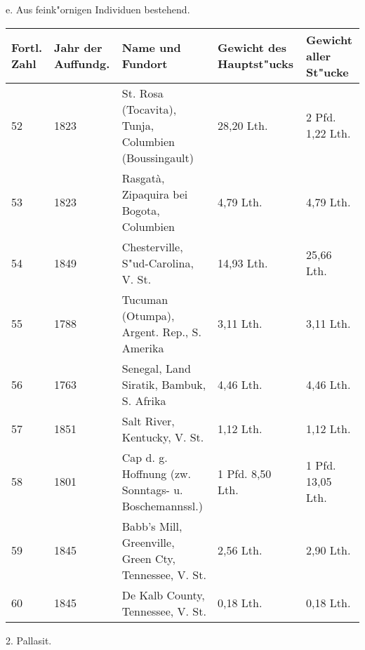 \documentclass[a4paper, 11pt, oneside]{article}
\begin{document}
\clearpage
\begin{center}
e. Aus feink"ornigen Individuen bestehend.
\end{center}
\begin{center}
\begin{footnotesize}
\begin{tabular}{ |p{7mm}|p{9mm}|p{45mm}|p{24mm}|p{24mm}| }
    \hline
    Fortl. Zahl & Jahr der Auffundg. & Name und Fundort & Gewicht des Hauptst"ucks & Gewicht aller St"ucke\\
    \hline\hline
    52 & 1823 & St. Rosa (Tocavita), Tunja, Columbien (Boussingault) & 28,20 Lth. & 2 Pfd. 1,22 Lth.\\\hline
    53 & 1823 & Rasgatà, Zipaquira bei Bogota, Columbien & 4,79 Lth. & 4,79 Lth.\\\hline
    54 & 1849 & Chesterville, S"ud-Carolina, V. St. & 14,93 Lth. & 25,66 Lth.\\\hline
    55 & 1788 & Tucuman (Otumpa), Argent. Rep., S. Amerika & 3,11 Lth. & 3,11 Lth.\\\hline
    56 & 1763 & Senegal, Land Siratik, Bambuk, S. Afrika & 4,46 Lth. & 4,46 Lth.\\\hline
    57 & 1851 & Salt River, Kentucky, V. St. & 1,12 Lth. & 1,12 Lth.\\\hline
    58 & 1801 & Cap d. g. Hoffnung (zw. Sonntags- u. Boschemannssl.) & 1 Pfd. 8,50 Lth. & 1 Pfd. 13,05 Lth.\\\hline
    59 & 1845 & Babb's Mill, Greenville, Green Cty, Tennessee, V. St. & 2,56 Lth. & 2,90 Lth.\\\hline
    60 & 1845 & De Kalb County, Tennessee, V. St. & 0,18 Lth. & 0,18 Lth.\\
    \hline
\end{tabular}
\end{footnotesize}
\end{center}
\clearpage
\begin{center}
2. Pallasit.
\end{center}
\end{document}
